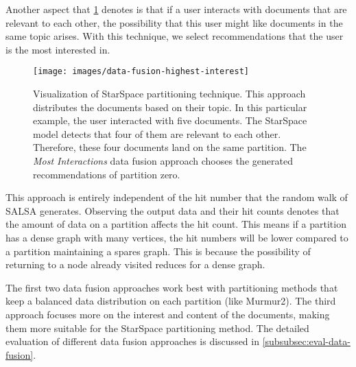 Another aspect that \ref{fig:data-fusion-highest-ineterest} denotes is that if a user interacts with documents that are relevant to each other, the possibility that this user might like documents in the same topic arises. With this technique, we select recommendations that the user is the most interested in. 


\begin{figure}[!htb]
    \centering
    \texttt{[image: images/data-fusion-highest-interest]}
    \caption{Visualization of StarSpace partitioning technique. This approach distributes the documents based on their topic. In this particular example, the user interacted with five documents. The StarSpace model detects that four of them are relevant to each other. Therefore, these four documents land on the same partition. The \emph{Most Interactions} data fusion approach chooses the generated recommendations of partition zero.}
    \label{fig:data-fusion-highest-ineterest}
\end{figure}


This approach is entirely independent of the hit number that the random walk of SALSA generates. Observing the output data and their hit counts denotes that the amount of data on a partition affects the hit count. This means if a partition has a dense graph with many vertices, the hit numbers will be lower compared to a partition maintaining a spares graph. This is because the possibility of returning to a node already visited reduces for a dense graph.


The first two data fusion approaches work best with partitioning methods that keep a balanced data distribution on each partition (like Murmur2). The third approach focuses more on the interest and content of the documents, making them more suitable for the StarSpace partitioning method. The detailed evaluation of different data fusion approaches is discussed in \ref{subsubsec:eval-data-fusion}.


